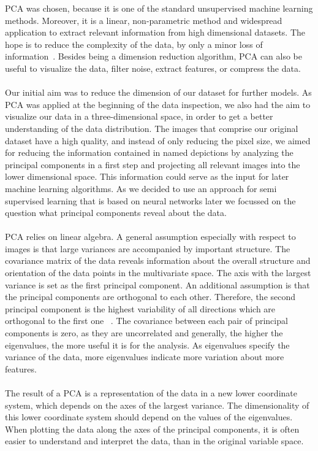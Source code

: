 PCA was chosen, because it is one of the standard unsupervised machine learning methods. Moreover, it is a linear, non-parametric method and widespread application to extract relevant information from high dimensional datasets. The hope is to reduce the complexity of the data, by only a minor loss of information~\citep{shlens2009}. Besides being a dimension reduction algorithm, PCA can also be useful to visualize the data, filter noise, extract features, or compress the data. \\
\\
Our initial aim was to reduce the dimension of our dataset for further models. As PCA was applied at the beginning of the data inspection, we also had the aim to visualize our data in a three-dimensional space, in order to get a better understanding of the data distribution. The images that comprise our original dataset have a high quality, and instead of only reducing the pixel size, we aimed for reducing the information contained in named depictions by analyzing the principal components in a first step and projecting all relevant images into the lower dimensional space. This information could serve as the input for later machine learning algorithms. As we decided to use an approach for semi supervised learning that is based on neural networks later we focussed on the question what principal components reveal about the data. \\
 \\
PCA relies on linear algebra. A general assumption especially with respect to images is that large variances are accompanied by important structure. The covariance matrix of the data reveals information about the overall structure and orientation of the data points in the multivariate space. The axis with the largest variance is set as the first principal component. An additional assumption is that the principal components are orthogonal to each other. Therefore, the second principal component is the highest variability of all directions which are orthogonal to the first one ~\citep{Bohling2006}. The covariance between each pair of principal components is zero, as they are uncorrelated and generally, the higher the eigenvalues, the more useful it is for the analysis. As eigenvalues specify the variance of the data, more eigenvalues indicate more variation about more features. \\
\\
The result of a PCA is a representation of the data in a new lower coordinate system, which depends on the axes of the largest variance. The dimensionality of this lower coordinate system should depend on the values of the eigenvalues. When plotting the data along the axes of the principal components, it is often easier to understand and interpret the data, than in the original variable space.  \\
